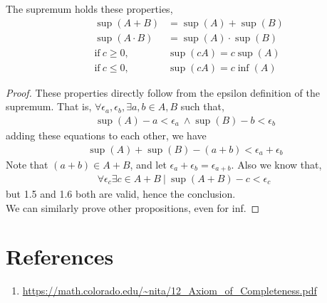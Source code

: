 \begin{proposition}
    The supremum holds these properties,
    \begin{align}
        &\sup(A+B) &= \sup(A) + \sup(B) \\
        &\sup(A \cdot B) &= \sup(A) \cdot \sup(B) \\
        &\text{if} \ c \ge 0, &\sup(cA) = c\sup(A)\\
        &\text{if} \ c \le 0, &\sup(cA) = c\inf(A)
    \end{align}
    \begin{proof}
        These properties directly follow from the epsilon definition of the supremum. That is, $\forall \epsilon_a, \epsilon_b, \exists a,b \in A,B$ such that,
        \begin{align*}
            \sup(A) -a < \epsilon_a \ \land \sup(B) -b < \epsilon_b
        \end{align*}
        adding these equations to each other, we have
        \begin{align} \sup(A) + \sup(B) - (a+b) < \epsilon_a + \epsilon_b \end{align}
        Note that $(a+b) \in A+B$, and let $\epsilon_a + \epsilon_b = \epsilon_{a+b}$. Also we know that,
        \begin{align}\forall \epsilon_c \exists c \in A+B \ | \ \sup(A+B) - c < \epsilon_c \ \end{align}
        but 1.5 and 1.6 both are valid, hence the conclusion. \\
        We can similarly prove other propositions, even for inf.
    \end{proof}

\end{proposition}
\section*{References}
\begin{enumerate}
    \item \url{https://math.colorado.edu/~nita/12_Axiom_of_Completeness.pdf}
\end{enumerate}

